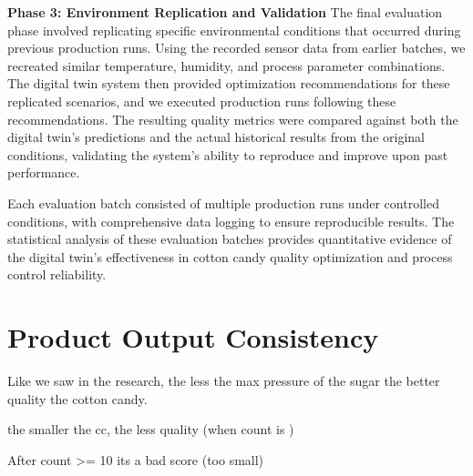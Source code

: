 \textbf{Phase 3: Environment Replication and Validation}
The final evaluation phase involved replicating specific environmental conditions that occurred during previous production runs. Using the recorded sensor data from earlier batches, we recreated similar temperature, humidity, and process parameter combinations. The digital twin system then provided optimization recommendations for these replicated scenarios, and we executed production runs following these recommendations. The resulting quality metrics were compared against both the digital twin's predictions and the actual historical results from the original conditions, validating the system's ability to reproduce and improve upon past performance.

Each evaluation batch consisted of multiple production runs under controlled conditions, with comprehensive data logging to ensure reproducible results. The statistical analysis of these evaluation batches provides quantitative evidence of the digital twin's effectiveness in cotton candy quality optimization and process control reliability.

\section{Product Output Consistency}
Like we saw in the research, the less the max pressure of the sugar the better quality the cotton candy.

the smaller the cc, the less quality (when count is )

After count >= 10 its a bad score (too small)
\todo{!!!!}